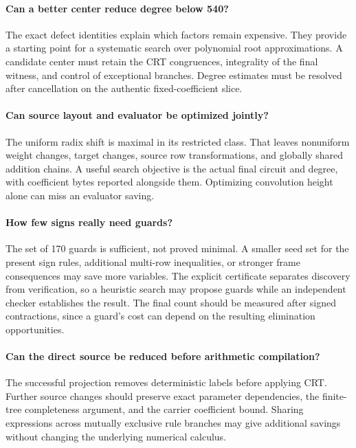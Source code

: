 \documentclass[11pt,a4paper]{article}
\theoremstyle{definition}
\begin{document}
\paragraph{Can a better center reduce degree below 540?}
The exact defect identities explain which factors remain expensive.
They provide a starting point for a systematic search over polynomial
root approximations. A candidate center must retain the CRT congruences,
integrality of the final witness, and control of exceptional branches.
Degree estimates must be resolved after cancellation on the authentic
fixed-coefficient slice.

\paragraph{Can source layout and evaluator be optimized jointly?}
The uniform radix shift is maximal in its restricted class. That leaves
nonuniform weight changes, target changes, source row transformations,
and globally shared addition chains. A useful search objective is the
actual final circuit and degree, with coefficient bytes reported alongside
them. Optimizing convolution height alone can miss an evaluator saving.

\paragraph{How few signs really need guards?}
The set of 170 guards is sufficient, not proved minimal. A smaller seed
set for the present sign rules, additional multi-row inequalities, or
stronger frame consequences may save more variables. The explicit
certificate separates discovery from verification, so a heuristic search
may propose guards while an independent checker establishes the result.
The final count should be measured after signed contractions, since a
guard's cost can depend on the resulting elimination opportunities.

\paragraph{Can the direct source be reduced before arithmetic compilation?}
The successful projection removes deterministic labels before applying
CRT. Further source changes should preserve exact parameter dependencies,
the finite-tree completeness argument, and the carrier coefficient bound.
Sharing expressions across mutually exclusive rule branches may give
additional savings without changing the underlying numerical calculus.
\end{document}
